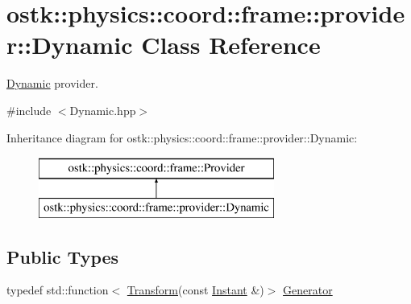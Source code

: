 \hypertarget{classostk_1_1physics_1_1coord_1_1frame_1_1provider_1_1_dynamic}{}\section{ostk\+:\+:physics\+:\+:coord\+:\+:frame\+:\+:provider\+:\+:Dynamic Class Reference}
\label{classostk_1_1physics_1_1coord_1_1frame_1_1provider_1_1_dynamic}


\hyperlink{classostk_1_1physics_1_1coord_1_1frame_1_1provider_1_1_dynamic}{Dynamic} provider.  




{\ttfamily \#include $<$Dynamic.\+hpp$>$}

Inheritance diagram for ostk\+:\+:physics\+:\+:coord\+:\+:frame\+:\+:provider\+:\+:Dynamic\+:\begin{figure}[H]
\begin{center}
\leavevmode
\includegraphics[height=2.000000cm]{classostk_1_1physics_1_1coord_1_1frame_1_1provider_1_1_dynamic}
\end{center}
\end{figure}
\subsection*{Public Types}
\begin{DoxyCompactItemize}
\item 
typedef std\+::function$<$ \hyperlink{classostk_1_1physics_1_1coord_1_1_transform}{Transform}(const \hyperlink{classostk_1_1physics_1_1time_1_1_instant}{Instant} \&)$>$ \hyperlink{classostk_1_1physics_1_1coord_1_1frame_1_1provider_1_1_dynamic_a1627a4b4e00ddcb81b50d3cabec711e8}{Generator}
\end{DoxyCompactItemize}
